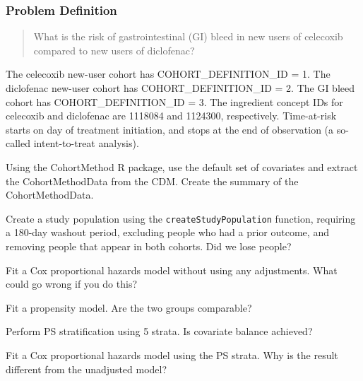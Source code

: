 \documentclass[11pt]{book}
\theoremstyle{definition}
\theoremstyle{definition}
\theoremstyle{definition}
\theoremstyle{remark}
\let\BeginKnitrBlock\begin \let\EndKnitrBlock\end
\begin{document}
\subsubsection*{Problem Definition}\label{problem-definition-2}

\begin{quote}
What is the risk of gastrointestinal (GI) bleed in new users of
celecoxib compared to new users of diclofenac?
\end{quote}

The celecoxib new-user cohort has COHORT\_DEFINITION\_ID = 1. The
diclofenac new-user cohort has COHORT\_DEFINITION\_ID = 2. The GI bleed
cohort has COHORT\_DEFINITION\_ID = 3. The ingredient concept IDs for
celecoxib and diclofenac are 1118084 and 1124300, respectively.
Time-at-risk starts on day of treatment initiation, and stops at the end
of observation (a so-called intent-to-treat analysis).

\BeginKnitrBlock{exercise}
\protect\hypertarget{exr:exercisePle1}{}{\label{exr:exercisePle1} }Using the
CohortMethod R package, use the default set of covariates and extract
the CohortMethodData from the CDM. Create the summary of the
CohortMethodData.
\EndKnitrBlock{exercise}

\BeginKnitrBlock{exercise}
\protect\hypertarget{exr:exercisePle2}{}{\label{exr:exercisePle2} }Create a
study population using the \texttt{createStudyPopulation} function,
requiring a 180-day washout period, excluding people who had a prior
outcome, and removing people that appear in both cohorts. Did we lose
people?
\EndKnitrBlock{exercise}

\BeginKnitrBlock{exercise}
\protect\hypertarget{exr:exercisePle3}{}{\label{exr:exercisePle3} }Fit a Cox
proportional hazards model without using any adjustments. What could go
wrong if you do this?
\EndKnitrBlock{exercise}

\BeginKnitrBlock{exercise}
\protect\hypertarget{exr:exercisePle4}{}{\label{exr:exercisePle4} }Fit a
propensity model. Are the two groups comparable?
\EndKnitrBlock{exercise}

\BeginKnitrBlock{exercise}
\protect\hypertarget{exr:exercisePle5}{}{\label{exr:exercisePle5} }Perform
PS stratification using 5 strata. Is covariate balance achieved?
\EndKnitrBlock{exercise}

\BeginKnitrBlock{exercise}
\protect\hypertarget{exr:exercisePle6}{}{\label{exr:exercisePle6} }Fit a Cox
proportional hazards model using the PS strata. Why is the result
different from the unadjusted model?
\EndKnitrBlock{exercise}
\end{document}

